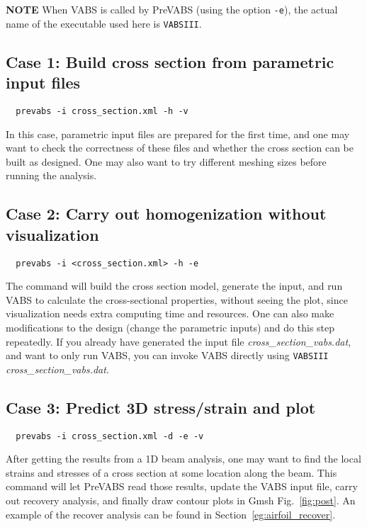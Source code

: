 \documentclass{book}
\begin{document}
\textbf{NOTE} When VABS is called by PreVABS (using the option \lstinline|-e|), 
the actual name of the executable used here is \lstinline|VABSIII|.

\subsection{Case 1: Build cross section from parametric input files}

\begin{lstlisting}
  prevabs -i cross_section.xml -h -v
\end{lstlisting}

In this case, parametric input files are prepared for the first time, 
and one may want to check the correctness of these files and whether 
the cross section can be built as designed. One may also want to try 
different meshing sizes before running the analysis.

\subsection{Case 2: Carry out homogenization without visualization}

\begin{lstlisting}
  prevabs -i <cross_section.xml> -h -e
\end{lstlisting}

The command will build the cross section model, generate the input, and 
run VABS to calculate the cross-sectional properties, without seeing the 
plot, since visualization needs extra computing time and resources. One 
can also make modifications to the design (change the parametric inputs) 
and do this step repeatedly. If you already have generated the input file 
\textit{cross\_section\_vabs.dat}, and want to only run VABS, you can 
invoke VABS directly using \lstinline{VABSIII} \textit{cross\_section\_vabs.dat}. 

\subsection{Case 3: Predict 3D stress/strain and plot}

\begin{lstlisting}
  prevabs -i cross_section.xml -d -e -v
\end{lstlisting}

After getting the results from a 1D beam analysis, one may want to find 
the local strains and stresses of a cross section at some location along 
the beam. This command will let PreVABS read those results, update the 
VABS input file, carry out recovery analysis, and finally draw contour 
plots in Gmsh Fig.~\ref{fig:post}. An example of the recover analysis 
can be found in Section~\ref{eg:airfoil_recover}.
\end{document}

